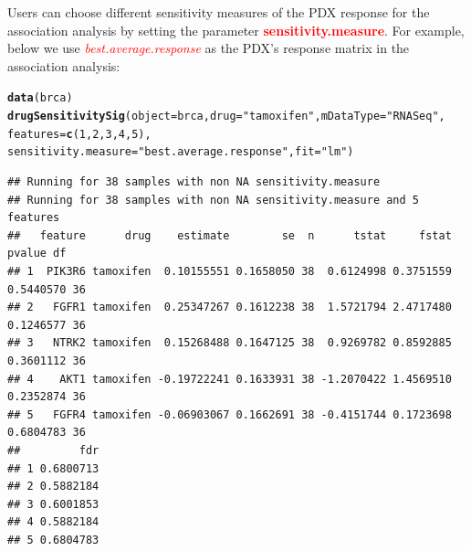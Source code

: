 \documentclass{article}\usepackage[]{graphicx}\usepackage[]{xcolor}
\makeatletter
\newcommand{\hlnum}[1]{\textcolor[rgb]{0.686,0.059,0.569}{#1}}%
\newcommand{\hlstr}[1]{\textcolor[rgb]{0.192,0.494,0.8}{#1}}%
\newcommand{\hlstd}[1]{\textcolor[rgb]{0.345,0.345,0.345}{#1}}%
\newcommand{\hlkwc}[1]{\textcolor[rgb]{0.333,0.667,0.333}{#1}}%
\newcommand{\hlkwd}[1]{\textcolor[rgb]{0.737,0.353,0.396}{\textbf{#1}}}%
\newenvironment{kframe}{%
 \def\at@end@of@kframe{}%
 \ifinner\ifhmode%
  \def\at@end@of@kframe{\end{minipage}}%
  \begin{minipage}{\columnwidth}%
 \fi\fi%
 \def\FrameCommand##1{\hskip\@totalleftmargin \hskip-\fboxsep
 \colorbox{shadecolor}{##1}\hskip-\fboxsep
     \hskip-\linewidth \hskip-\@totalleftmargin \hskip\columnwidth}%
 \MakeFramed {\advance\hsize-\width
   \@totalleftmargin\z@ \linewidth\hsize
   \@setminipage}}%
 {\par\unskip\endMakeFramed%
 \at@end@of@kframe}
\newenvironment{knitrout}{}{} %
\makeatother
\begin{document}
Users can choose different sensitivity measures of the PDX response for the
association analysis by setting the parameter \textbf{\textcolor{red}{sensitivity.measure}}.
For example, below we use \textit{\textcolor{red}{best.average.response}} as
the PDX's response matrix in the association analysis:
\begin{knitrout}
\color{fgcolor}\begin{kframe}
\begin{alltt}
\hlkwd{data}\hlstd{(brca)}
\hlkwd{drugSensitivitySig}\hlstd{(}\hlkwc{object}\hlstd{=brca,} \hlkwc{drug}\hlstd{=}\hlstr{"tamoxifen"}\hlstd{,} \hlkwc{mDataType}\hlstd{=}\hlstr{"RNASeq"}\hlstd{,}
                   \hlkwc{features}\hlstd{=}\hlkwd{c}\hlstd{(}\hlnum{1}\hlstd{,}\hlnum{2}\hlstd{,}\hlnum{3}\hlstd{,}\hlnum{4}\hlstd{,}\hlnum{5}\hlstd{),}
                   \hlkwc{sensitivity.measure}\hlstd{=}\hlstr{"best.average.response"}\hlstd{,} \hlkwc{fit} \hlstd{=} \hlstr{"lm"}\hlstd{)}
\end{alltt}
\begin{verbatim}
## Running for 38 samples with non NA sensitivity.measure
## Running for 38 samples with non NA sensitivity.measure and 5 features
##   feature      drug    estimate        se  n      tstat     fstat    pvalue df
## 1  PIK3R6 tamoxifen  0.10155551 0.1658050 38  0.6124998 0.3751559 0.5440570 36
## 2   FGFR1 tamoxifen  0.25347267 0.1612238 38  1.5721794 2.4717480 0.1246577 36
## 3   NTRK2 tamoxifen  0.15268488 0.1647125 38  0.9269782 0.8592885 0.3601112 36
## 4    AKT1 tamoxifen -0.19722241 0.1633931 38 -1.2070422 1.4569510 0.2352874 36
## 5   FGFR4 tamoxifen -0.06903067 0.1662691 38 -0.4151744 0.1723698 0.6804783 36
##         fdr
## 1 0.6800713
## 2 0.5882184
## 3 0.6001853
## 4 0.5882184
## 5 0.6804783
\end{verbatim}
\end{kframe}
\end{knitrout}
\end{document}
